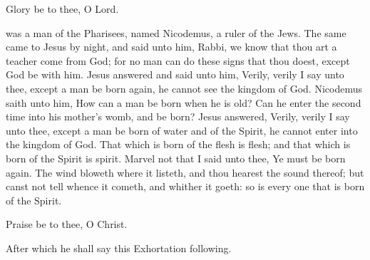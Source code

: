 \begin{leftbar}
 Glory be to thee, O Lord.
\end{leftbar}

 was a man of the Pharisees, named Nicodemus, a ruler of the Jews.
The same came to Jesus by night, and said unto him, Rabbi, we know that thou art a teacher come from God; for no man can do these signs that thou doest, except God be with him.
Jesus answered and said unto him, Verily, verily I say unto thee, except a man be born again, he cannot see the kingdom of God.
Nicodemus saith unto him, How can a man be born when he is old?
Can he enter the second time into his mother's womb, and be born?
Jesus answered, Verily, verily I say unto thee, except a man be born of water and of the Spirit, he cannot enter into the kingdom of God.
That which is born of the flesh is flesh; and that which is born of the Spirit is spirit.
Marvel not that I said unto thee, Ye must be born again.
The wind bloweth where it listeth, and thou hearest the sound thereof; but canst not tell whence it cometh, and whither it goeth: so is every one that is born of the Spirit.

\begin{leftbar}
 Praise be to thee, O Christ.
\end{leftbar}

\begin{rubric}
After which he shall say this Exhortation following.
\end{rubric}

